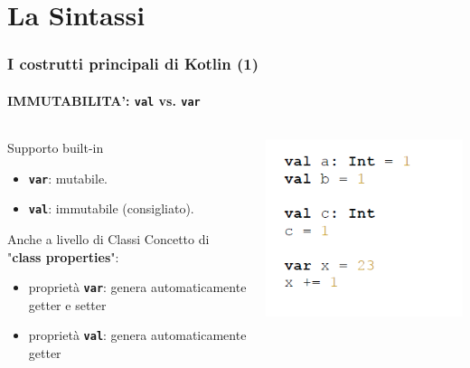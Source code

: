     \section{La Sintassi}
    \begin{frame}
      \frametitle{I costrutti principali di Kotlin (1)}
      \framesubtitle{IMMUTABILITA': \textbf{\texttt{val}} vs. \textbf{\texttt{var}}}
      \begin{columns}
        \begin{column}{0.47\textwidth}
          \begin{block}{Supporto built-in}
            \begin{itemize}
              \item \textbf{\texttt{var}}: mutabile.
              \item \textbf{\texttt{val}}: immutabile (consigliato).
            \end{itemize}
          \end{block}
          \begin{block}{Anche a livello di Classi}
            Concetto di "\textbf{class properties}":
            \begin{itemize}
              \item proprietà \textbf{\texttt{var}}: \alert{genera} automaticamente getter e setter
              \item proprietà \textbf{\texttt{val}}: \alert{genera} automaticamente getter
            \end{itemize}
          \end{block}
        \end{column}
        \begin{column}{0.5\textwidth}
            \includegraphics[scale=0.75]{Immutability}
        \end{column}
      \end{columns}
    \end{frame}

